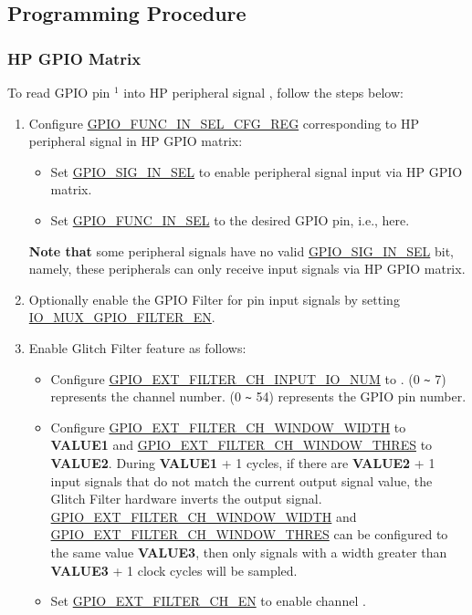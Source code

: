 \documentclass[main\_\_EN.tex]{subfiles}
\begin{document}
\subsection{Programming Procedure}
\label{sec:functional-description}
\subsubsection{HP GPIO Matrix}
\label{sec:prgramming-procedure-for-hp}
To read GPIO pin \hyperref[input-note-1]{$^1$} into HP peripheral signal , follow the steps below:

\begin{enumerate}
    \item Configure \hyperref[regdesc:GPIOFUNCNINSELCFGREG]{GPIO\_FUNC\_IN\_SEL\_CFG\_REG} corresponding to HP peripheral signal  in HP GPIO matrix:
    \begin{itemize}
        \item Set \hyperref[fielddesc:GPIOSIGNINSEL]{GPIO\_SIG\_IN\_SEL} to enable peripheral signal input via HP GPIO matrix.
        \item Set \hyperref[fielddesc:GPIOFUNCNINSEL]{GPIO\_FUNC\_IN\_SEL} to the desired GPIO pin, i.e.,  here.
    \end{itemize}
    {\bfseries Note that} some peripheral signals have no valid \hyperref[fielddesc:GPIOSIGNINSEL]{GPIO\_SIG\_IN\_SEL} bit, namely, these peripherals can only receive input signals via HP GPIO matrix.
    \item \label{step:2} Optionally enable the GPIO Filter for pin input signals by setting \hyperref[fielddesc:IOMUXGPIONFILTEREN] {IO\_MUX\_GPIO\_FILTER\_EN}.
\item \label{step:3}  Enable Glitch Filter feature as follows:
\begin{itemize}
    \item Configure \hyperref[fielddesc:GPIOSDFILTERCH0INPUTIONUM]{GPIO\_EXT\_FILTER\_CH\_INPUT\_IO\_NUM} to .  (0 \verb+~+ 7) represents the channel number.  (0 \verb+~+ 54) represents the GPIO pin number.
    \item Configure \hyperref[fielddesc:GPIOSDFILTERCH0WINDOWWIDTH]{GPIO\_EXT\_FILTER\_CH\_WINDOW\_WIDTH} to \textbf{VALUE1} and \hyperref[fielddesc:GPIOSDFILTERCH0WINDOWTHRES]{GPIO\_EXT\_FILTER\_CH\_WINDOW\_THRES} to \textbf{VALUE2}. During \textbf{VALUE1} + 1 cycles, if there are \textbf{VALUE2} + 1 input signals that do not match the current output signal value, the Glitch Filter hardware inverts the output signal. \hyperref[fielddesc:GPIOSDFILTERCH0WINDOWWIDTH]{GPIO\_EXT\_FILTER\_CH\_WINDOW\_WIDTH} and  \hyperref[fielddesc:GPIOSDFILTERCH0WINDOWTHRES]{GPIO\_EXT\_FILTER\_CH\_WINDOW\_THRES} can be configured to the same value \textbf{VALUE3}, then only signals with a width greater than \textbf{VALUE3} + 1 clock cycles will be sampled.
    \item Set  \hyperref[fielddesc:GPIOSDFILTERCH0EN]{GPIO\_EXT\_FILTER\_CH\_EN} to enable channel .
\end{itemize}


\end{enumerate}
\end{document}
